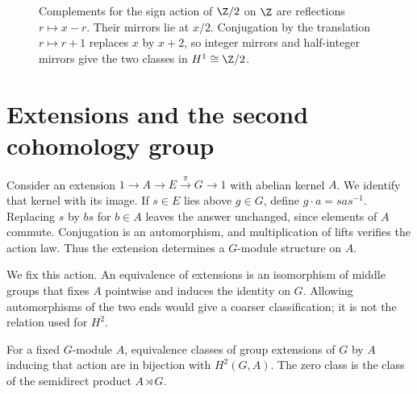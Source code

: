 \begin{figure}[ht]
\centering
{}
\caption{Complements for the sign action of $\Z/2$ on $\Z$ are reflections $r\mapsto x-r$. Their mirrors lie at $x/2$. Conjugation by the translation $r\mapsto r+1$ replaces $x$ by $x+2$, so integer mirrors and half-integer mirrors give the two classes in $H^1\cong\Z/2$.}
\label{fig:v10new-ch08-complements}
\end{figure}

\section{Extensions and the second cohomology group}\label{sec:extensions}

Consider an extension $1\to A\to E\xrightarrow{\pi}G\to1$ with abelian kernel $A$. We identify that kernel with its image. If $s\in E$ lies above $g\in G$, define $g\cdot a=sas^{-1}$. Replacing $s$ by $bs$ for $b\in A$ leaves the answer unchanged, since elements of $A$ commute. Conjugation is an automorphism, and multiplication of lifts verifies the action law. Thus the extension determines a $G$-module structure on $A$.

We fix this action. An equivalence of extensions is an isomorphism of middle groups that fixes $A$ pointwise and induces the identity on $G$. Allowing automorphisms of the two ends would give a coarser classification; it is not the relation used for $H^2$.

\begin{theorem}[Schreier]\label{thm:h2ext}
For a fixed $G$-module $A$, equivalence classes of group extensions of $G$ by $A$ inducing that action are in bijection with $H^2(G,A)$. The zero class is the class of the semidirect product $A\rtimes G$.
\end{theorem}

